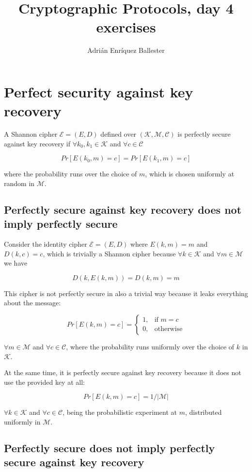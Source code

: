 \documentclass{article}
\title{Cryptographic Protocols, day 4 exercises}
\author{Adrián Enríquez Ballester}
\begin{document}
\maketitle

\section{Perfect security against key recovery}

A Shannon cipher $\mathcal{E} = (E, D)$ defined over $(\mathcal{K},
\mathcal{M}, \mathcal{C})$ is perfectly secure against key recovery 
if $\forall k_0, k_1 \in \mathcal{K}$ and 
$\forall c \in \mathcal{C}$

$$ Pr[E(k_0, m) = c] = Pr[E(k_1, m) = c] $$

where the probability runs over the choice of $m$, which is chosen 
uniformly at random in $\mathcal{M}$.

\subsection{Perfectly secure against key recovery does not imply perfectly secure}

Consider the identity cipher $\mathcal{E} = (E, D)$ where 
$E(k, m) = m$ and $D(k, c) = c$, which is trivially a Shannon 
cipher because $\forall k \in \mathcal{K}$ and 
$\forall m \in \mathcal{M}$ we have

$$ D(k, E(k, m)) = D(k, m) = m $$

This cipher is not perfectly secure in also a trivial way because 
it leaks everything about the message:

$$
  Pr[E(k, m) = c] = 
  \begin{cases}
    1, & \text{if } m = c \\
    0, & \text{otherwise}
  \end{cases} 
$$

$\forall m \in \mathcal{M}$ and $\forall c \in \mathcal{C}$, where 
the probability runs uniformly over the choice of $k$ 
in $\mathcal{K}$. 

At the same time, it is perfectly 
secure against key recovery because it does not use the provided
key at all:

\[ Pr[E(k, m) = c] = 1 / \left|\mathcal{M}\right| \]

$\forall k \in \mathcal{K}$ and $\forall c \in \mathcal{C}$, being
the probabilistic experiment at $m$, distributed uniformly in 
$\mathcal{M}$.

\subsection{Perfectly secure does not imply perfectly secure against key recovery}
\end{document}
